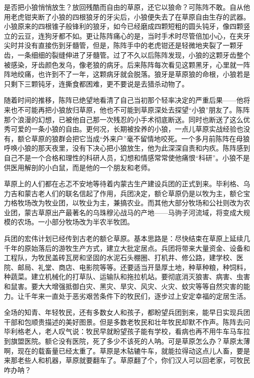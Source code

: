 \par 是否把小狼悄悄放生？放回残酷而自由的草原，还它以狼命？可陈阵不敢。自从他用老虎钳夹断了小狼的四根狼牙的牙尖后，小狼便失去了在草原自由生存的武器。小狼原来的四根锥子般锋利的狼牙，如今已经磨成四颗短粗的圆头钝牙，像四颗竖立的云豆，连狗牙都不如。更让陈阵痛心的是，当时手术时尽管倍加小心，在夹牙尖时并没有直接伤到牙髓管，但是，陈阵手中的老虎钳还是轻微地夹裂了一颗牙齿，一条细细的裂缝伸进了牙髓管。过了不久以后陈阵发现，小狼的这颗牙齿整个被感染，牙齿颜色发乌，像老狼的病牙。后来陈阵每次看见这颗黑牙，心里就一阵阵地绞痛，也许到不了一年，这颗病牙就会脱落。狼牙是草原狼的命根，小狼若是只剩下三颗钝牙，连撕食都困难，更不要说是去猎杀动物了。
\par 随着时间的推移，陈阵已绝望地看清了自己当初那个轻率决定的严重后果——他将来也不可能再把小狼放归草原，他也不可能到草原深处去探望“小狼”朋友了。陈阵那个浪漫的幻想，已被他自己那一次残忍的小手术彻底断送。同时也断送了这么优秀可爱的一条小狼的自由。更何况，长期被拴养的小狼，一点儿草原实战经验也没有，额仑草原的狼群会把它当成“外来户”毫不留情地咬死。一个多月前陈阵在母狼呼唤小狼的那天夜里，没有下决心把小狼放生，他为此深深自责和内疚。陈阵感到自己不是一个合格和理性的科研人员，幻想和情感常常使他痛恨“科研”。小狼不是供医用解剖的小白鼠，而是他的一个朋友和老师。
\par 
\par 草原上的人们都在忐忑不安地等待着内蒙古生产建设兵团的正式到来。毕利格、乌力吉和蒙古老人们的联名信起了作用，兵团决定，额仑草原仍是以牧为主，额仑宝力格牧场改为牧业团，以牧业为主，兼搞农业。而其他大部分牧场和公社则改为农业团，蒙古草原出产最著名的乌珠穆沁战马的产地——马驹子河流域，将变成大规模的农场。一小部分牧场改为半农半牧团。
\par 兵团的宏伟计划已经传到古老的额仑草原。基本思路是：尽快结束在草原上延续几千年的原始落后的游牧生产方式，建立大批定居点。兵团将带来大量资金、设备和工程队，为牧民盖砖瓦房和坚固的水泥石头棚圈、打机井、修公路，建学校、医院、邮局、礼堂、商店、电影院等等。还要适当开垦厚土地，种草种粮，种饲料，种蔬菜。建立机械化的打草队、运输队和拖拉机站。要彻底消灭狼害、病害、虫害和鼠害。要大大增强抵御白灾、黑灾、旱灾、风灾、火灾、蚊灾等等自然灾害的能力。让千年来一直处于恶劣艰苦条件下的牧民们，逐步过上安定幸福的定居生活。
\par 全场的知青、年轻牧民，还有多数女人和孩子，都盼望兵团到来，能早日实现兵团干部和包顺贵描述的美好图景。但是多数老牧民和壮年牧民却默不作声。陈阵去问毕利格老人，老人叹气说：牧民早就盼望孩子能有学校，看病也再不用牛车马车拉到旗盟医院。额仑没有医院，死了多少不该死的人呐。可是草原怎么办？草原太薄啊，现在的载畜量已经太重了。草原是木轱辘牛车，就能拉得动这点儿人畜，要是来那老些人和机器，草原就要翻车了。草原翻了个，你们汉人可以回老家，可牧民咋办呐？
